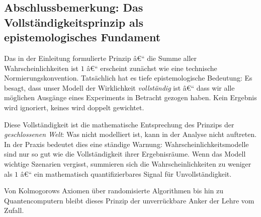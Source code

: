 ﻿\documentclass[12pt,a4paper]{article}
\theoremstyle{definition}
\theoremstyle{plain}
\theoremstyle{remark}
\begin{document}
\subsection{Abschlussbemerkung: Das Vollständigkeitsprinzip als\\ epistemologisches Fundament}

Das in der Einleitung formulierte Prinzip â€“ die Summe aller Wahrscheinlichkeiten
ist $1$ â€“ erscheint zunächst wie eine technische Normierungskonvention.
Tatsächlich hat es tiefe epistemologische Bedeutung: Es besagt, dass unser
Modell der Wirklichkeit \emph{vollständig} ist â€“ dass wir alle möglichen
Ausgänge eines Experiments in Betracht gezogen haben. Kein Ergebnis wird
ignoriert, keines wird doppelt gewichtet.

Diese Vollständigkeit ist die mathematische Entsprechung des Prinzips der
\emph{geschlossenen Welt}: Was nicht modelliert ist, kann in der Analyse
nicht auftreten. In der Praxis bedeutet dies eine ständige Warnung:
Wahrscheinlichkeitsmodelle sind nur so gut wie die Vollständigkeit
ihrer Ergebnisräume. Wenn das Modell wichtige Szenarien vergisst, summieren
sich die Wahrscheinlichkeiten zu weniger als $1$ â€“ ein mathematisch
quantifizierbares Signal für Unvollständigkeit.

Von Kolmogorows Axiomen über randomisierte Algorithmen bis hin zu
Quantencomputern bleibt dieses Prinzip der unverrückbare Anker der
Lehre vom Zufall.
\end{document}
